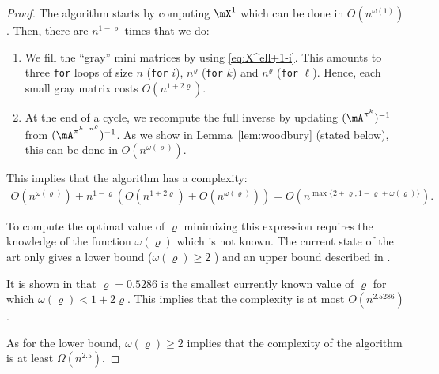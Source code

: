 \begin{proof}
    The algorithm starts by computing $\mX^1$ which can be done in $O( n^{\omega(1)})$. Then, there are $ n^{1-\varrho} $ times that we do:
    \begin{enumerate}
        \item We fill the ``gray'' mini matrices by using \eqref{eq:X^ell+1-i}. This amounts to three \texttt{for} loops of size $n$ (\texttt{for} $i$), $ n^\varrho $ (\texttt{for} $k$) and $ n^\varrho $ (\texttt{for} $\ell$). Hence, each small gray matrix costs $O( n^{1+2\varrho} )$.
        \item At the end of a cycle, we recompute the full inverse by updating $(\mA^{\pi^k})^{-1}$ from $(\mA^{\pi^{k- n^\varrho }})^{-1}$. As we show in Lemma~\ref{lem:woodbury} (stated below), this can be done in $O( n^{\omega(\varrho)} )$.
    \end{enumerate}
This implies that the algorithm has a complexity:
    \begin{align*}
        O( n^{\omega(\varrho)} ) +  n^{1-\varrho}  \left(O( n^{1+2\varrho} )+O( n^{\omega(\varrho)} )\right)  = O( n^{\max\{2+\varrho, 1-\varrho + \omega(\varrho)\}} ).
    \end{align*}
    
    To compute the optimal value of $\varrho$ minimizing this expression requires the knowledge of the function 
    $\omega(\varrho)$ which is  not known. The current state of the art  only gives  a lower bound ($\omega(\varrho) \geq 2$ ) and an upper bound described in  \cite{gall2018improved}.
    
    It is shown in \cite[Table~3]{gall2018improved} that $\varrho=0.5286$ is the smallest currently known value of $\varrho$ for which  $\omega(\varrho)<1+2\varrho$. This implies that the complexity is  at most $O(n^{2.5286})$.
    
    As for the lower bound,  $\omega(\varrho) \geq 2$ implies that the complexity of the
    algorithm is at least  $\Omega(n^{2.5})$.
\end{proof}
  
